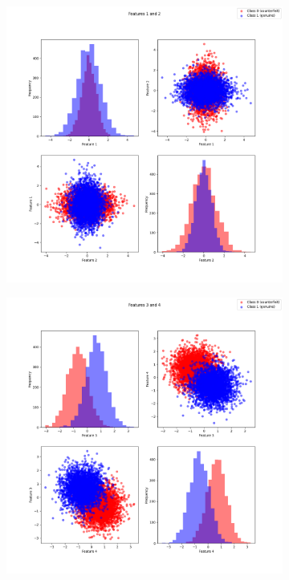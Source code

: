 \documentclass[12pt]{report}
\begin{document}
\begin{figure}[H]
    \centering
    \begin{subfigure}[t]{0.33\textwidth}
        \includegraphics[width=\textwidth]{./plot/features/features_1_2.png}
    \end{subfigure}
    \begin{subfigure}[t]{0.33\textwidth}
        \includegraphics[width=\textwidth]{./plot/features/features_3_4.png}

\end{subfigure}
\end{figure}
\end{document}

